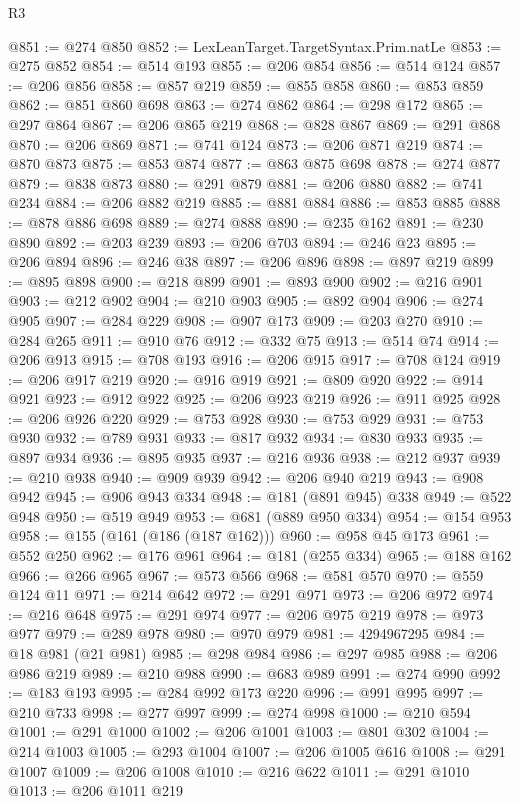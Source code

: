 \begin{lexlean}{R3}
\begin{coremodule}
@851 := @274 @850
@852 := LexLeanTarget.TargetSyntax.Prim.natLe
@853 := @275 @852
@854 := @514 @193
@855 := @206 @854
@856 := @514 @124
@857 := @206 @856
@858 := @857 @219
@859 := @855 @858
@860 := @853 @859
@862 := @851 @860 @698
@863 := @274 @862
@864 := @298 @172
@865 := @297 @864
@867 := @206 @865 @219
@868 := @828 @867
@869 := @291 @868
@870 := @206 @869
@871 := @741 @124
@873 := @206 @871 @219
@874 := @870 @873
@875 := @853 @874
@877 := @863 @875 @698
@878 := @274 @877
@879 := @838 @873
@880 := @291 @879
@881 := @206 @880
@882 := @741 @234
@884 := @206 @882 @219
@885 := @881 @884
@886 := @853 @885
@888 := @878 @886 @698
@889 := @274 @888
@890 := @235 @162
@891 := @230 @890
@892 := @203 @239
@893 := @206 @703
@894 := @246 @23
@895 := @206 @894
@896 := @246 @38
@897 := @206 @896
@898 := @897 @219
@899 := @895 @898
@900 := @218 @899
@901 := @893 @900
@902 := @216 @901
@903 := @212 @902
@904 := @210 @903
@905 := @892 @904
@906 := @274 @905
@907 := @284 @229
@908 := @907 @173
@909 := @203 @270
@910 := @284 @265
@911 := @910 @76
@912 := @332 @75
@913 := @514 @74
@914 := @206 @913
@915 := @708 @193
@916 := @206 @915
@917 := @708 @124
@919 := @206 @917 @219
@920 := @916 @919
@921 := @809 @920
@922 := @914 @921
@923 := @912 @922
@925 := @206 @923 @219
@926 := @911 @925
@928 := @206 @926 @220
@929 := @753 @928
@930 := @753 @929
@931 := @753 @930
@932 := @789 @931
@933 := @817 @932
@934 := @830 @933
@935 := @897 @934
@936 := @895 @935
@937 := @216 @936
@938 := @212 @937
@939 := @210 @938
@940 := @909 @939
@942 := @206 @940 @219
@943 := @908 @942
@945 := @906 @943 @334
@948 := @181 (@891 @945) @338
@949 := @522 @948
@950 := @519 @949
@953 := @681 (@889 @950 @334)
@954 := @154 @953
@958 := @155 (@161 (@186 (@187 @162)))
@960 := @958 @45 @173
@961 := @552 @250
@962 := @176 @961
@964 := @181 (@255 @334)
@965 := @188 @162
@966 := @266 @965
@967 := @573 @566
@968 := @581 @570
@970 := @559 @124 @11
@971 := @214 @642
@972 := @291 @971
@973 := @206 @972
@974 := @216 @648
@975 := @291 @974
@977 := @206 @975 @219
@978 := @973 @977
@979 := @289 @978
@980 := @970 @979
@981 := 4294967295
@984 := @18 @981 (@21 @981)
@985 := @298 @984
@986 := @297 @985
@988 := @206 @986 @219
@989 := @210 @988
@990 := @683 @989
@991 := @274 @990
@992 := @183 @193
@995 := @284 @992 @173 @220
@996 := @991 @995
@997 := @210 @733
@998 := @277 @997
@999 := @274 @998
@1000 := @210 @594
@1001 := @291 @1000
@1002 := @206 @1001
@1003 := @801 @302
@1004 := @214 @1003
@1005 := @293 @1004
@1007 := @206 @1005 @616
@1008 := @291 @1007
@1009 := @206 @1008
@1010 := @216 @622
@1011 := @291 @1010
@1013 := @206 @1011 @219

\end{coremodule}
\end{lexlean}
